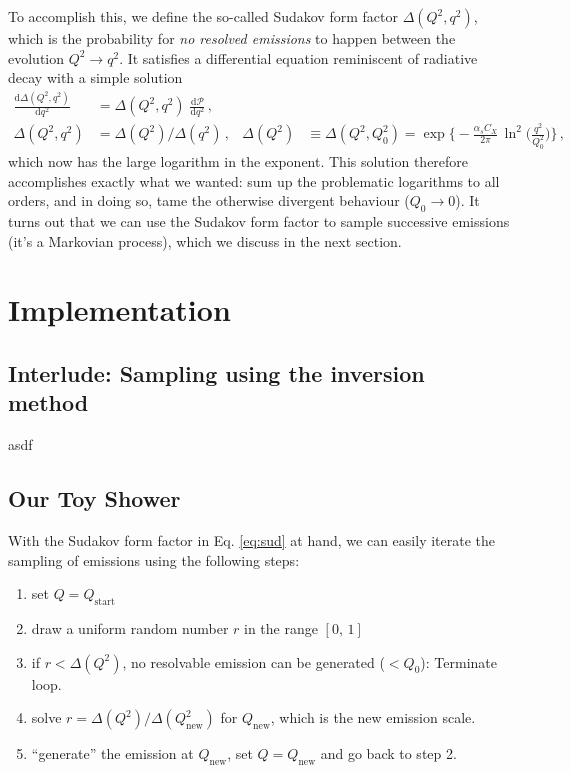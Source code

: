 \documentclass[11pt]{article}
\begin{document}
To accomplish this, we define the so-called Sudakov form factor \(\Delta(Q^2,q^2)\), which is the probability for \emph{no resolved emissions} to happen between the evolution \(Q^2 \to q^2\).
It satisfies a differential equation reminiscent of radiative decay with a simple solution
\begin{align}
\label{eq:sud}
  \frac{\mathrm{d}\Delta(Q^2,q^2)}{\mathrm{d}q^2}
  &=
  \Delta(Q^2,q^2) \; \frac{\mathrm{d}\mathcal{P}}{\mathrm{d}q^2}
  \,,\nonumber\\
  \Delta(Q^2,q^2)
  &=
  \Delta(Q^2) / \Delta(q^2)
  \,,&
  \Delta(Q^2)
  &\equiv \Delta(Q^2,Q_0^2)
  =
  \exp\biggl\{-\frac{\alpha_s C_X}{2\pi} \, \ln^2\biggl(\frac{q^2}{Q_0^2}\biggr) \biggr\}
  \,,
\end{align}
which now has the large logarithm in the exponent.
This solution therefore accomplishes exactly what we wanted: sum up the problematic logarithms to all orders, and in doing so, tame the otherwise divergent behaviour (\(Q_0\to0\)).
It turns out that we can use the Sudakov form factor to sample successive emissions (it's a Markovian process), which we discuss in the next section.

\section{Implementation}
\label{sec:org7ea9547}

\subsection{Interlude: Sampling using the inversion method}
\label{sec:orged95a4a}
asdf

\subsection{Our Toy Shower}
\label{sec:org154ccd1}
With the Sudakov form factor in Eq. \eqref{eq:sud} at hand, we can easily iterate the sampling of emissions using the following steps:
\begin{enumerate}
\item set \(Q = Q_\mathrm{start}\)
\item draw a uniform random number \(r\) in the range \([0,\,1]\)
\item if \(r<\Delta(Q^2)\), no resolvable emission can be generated (\(<Q_0\)):
Terminate loop.
\item solve \(r = \Delta(Q^2) / \Delta(Q_\mathrm{new}^2)\) for \(Q_\mathrm{new}\), which is the new emission scale.
\item ``generate'' the emission at \(Q_\mathrm{new}\), set \(Q = Q_\mathrm{new}\) and go back to step 2.
\end{enumerate}
\end{document}
